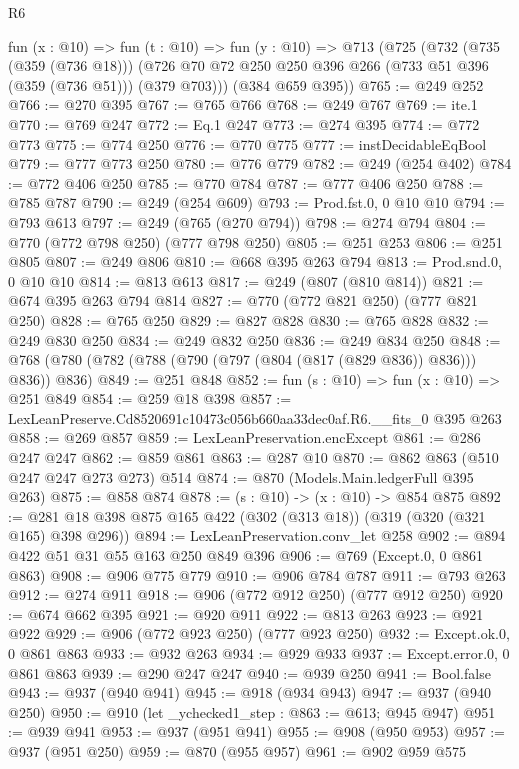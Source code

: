 \begin{lexlean}{R6}
\begin{coremodule}
  fun (x : @10) =>
  fun (t : @10) =>
  fun (y : @10) =>
  @713
    (@725
      (@732
        (@735 (@359 (@736 @18)))
        (@726 @70 @72 @250 @250 @396 @266 (@733 @51 @396 (@359 (@736 @51))) (@379 @703)))
      (@384 @659 @395))
@765 := @249 @252
@766 := @270 @395
@767 := @765 @766
@768 := @249 @767
@769 := ite.{1}
@770 := @769 @247
@772 := Eq.{1} @247
@773 := @274 @395
@774 := @772 @773
@775 := @774 @250
@776 := @770 @775
@777 := instDecidableEqBool
@779 := @777 @773 @250
@780 := @776 @779
@782 := @249 (@254 @402)
@784 := @772 @406 @250
@785 := @770 @784
@787 := @777 @406 @250
@788 := @785 @787
@790 := @249 (@254 @609)
@793 := Prod.fst.{0, 0} @10 @10
@794 := @793 @613
@797 := @249 (@765 (@270 @794))
@798 := @274 @794
@804 := @770 (@772 @798 @250) (@777 @798 @250)
@805 := @251 @253
@806 := @251 @805
@807 := @249 @806
@810 := @668 @395 @263 @794
@813 := Prod.snd.{0, 0} @10 @10
@814 := @813 @613
@817 := @249 (@807 (@810 @814))
@821 := @674 @395 @263 @794 @814
@827 := @770 (@772 @821 @250) (@777 @821 @250)
@828 := @765 @250
@829 := @827 @828
@830 := @765 @828
@832 := @249 @830 @250
@834 := @249 @832 @250
@836 := @249 @834 @250
@848 := @768 (@780 (@782 (@788 (@790 (@797 (@804 (@817 (@829 @836)) @836))) @836)) @836)
@849 := @251 @848
@852 := fun (s : @10) => fun (x : @10) => @251 @849
@854 := @259 @18 @398
@857 := LexLeanPreserve.Cd8520691c10473c056b660aa33dec0af.R6.__fits_0 @395 @263
@858 := @269 @857
@859 := LexLeanPreservation.encExcept
@861 := @286 @247 @247
@862 := @859 @861
@863 := @287 @10
@870 := @862 @863 (@510 @247 @247 @273 @273) @514
@874 := @870 (Models.Main.ledgerFull @395 @263)
@875 := @858 @874
@878 := (s : @10) -> (x : @10) -> @854 @875
@892 := @281 @18 @398 @875 @165 @422 (@302 (@313 @18)) (@319 (@320 (@321 @165) @398 @296))
@894 := LexLeanPreservation.conv_let @258
@902 := @894 @422 @51 @31 @55 @163 @250 @849 @396
@906 := @769 (Except.{0, 0} @861 @863)
@908 := @906 @775 @779
@910 := @906 @784 @787
@911 := @793 @263
@912 := @274 @911
@918 := @906 (@772 @912 @250) (@777 @912 @250)
@920 := @674 @662 @395
@921 := @920 @911
@922 := @813 @263
@923 := @921 @922
@929 := @906 (@772 @923 @250) (@777 @923 @250)
@932 := Except.ok.{0, 0} @861 @863
@933 := @932 @263
@934 := @929 @933
@937 := Except.error.{0, 0} @861 @863
@939 := @290 @247 @247
@940 := @939 @250
@941 := Bool.false
@943 := @937 (@940 @941)
@945 := @918 (@934 @943)
@947 := @937 (@940 @250)
@950 := @910 (let _ychecked1_step : @863 := @613; @945 @947)
@951 := @939 @941
@953 := @937 (@951 @941)
@955 := @908 (@950 @953)
@957 := @937 (@951 @250)
@959 := @870 (@955 @957)
@961 := @902 @959 @575

\end{coremodule}
\end{lexlean}

